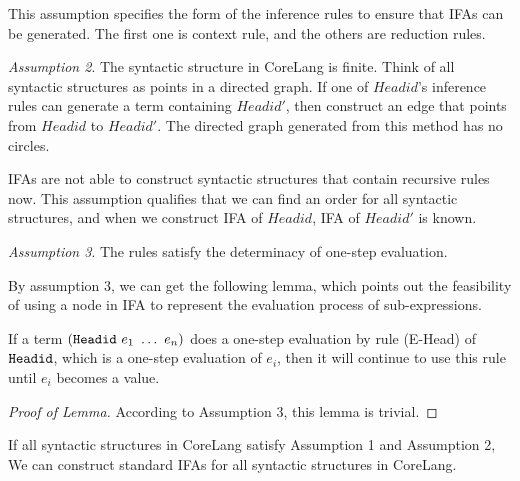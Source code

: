 This assumption specifies the form of the inference rules to ensure that IFAs can be generated. The first one is context rule, and the others are reduction rules.

\textit{Assumption 2}. The syntactic structure in CoreLang is finite. Think of all syntactic structures as points in a directed graph. If one of $Headid$'s inference rules can generate a term containing $Headid'$, then construct an edge that points from $Headid$ to $Headid'$. The directed graph generated from this method has no circles.

IFAs are not able to construct syntactic structures that contain recursive rules now. This assumption qualifies that we can find an order for all syntactic structures, and when we construct IFA of $Headid$, IFA of $Headid'$ is known.

\textit{Assumption 3}. The rules satisfy the determinacy of one-step evaluation.

By assumption 3, we can get the following lemma, which points out the feasibility of using a node in IFA to represent the evaluation process of sub-expressions.

\begin{lemma}
If a term $(\mbox{\tt Headid}~e_1~\ldots~e_n)$ does a one-step evaluation by rule (E-Head) of $\mbox{\tt Headid}$, which is a one-step evaluation of $e_i$, then it will continue to use this rule until $e_i$ becomes a value.
\end{lemma}

\begin{proof}[Proof of Lemma]
According to Assumption 3, this lemma is trivial.
\end{proof}

\begin{lemma}
If all syntactic structures in CoreLang satisfy Assumption 1 and Assumption 2, We can construct standard IFAs for all syntactic structures in CoreLang.
\end{lemma}

